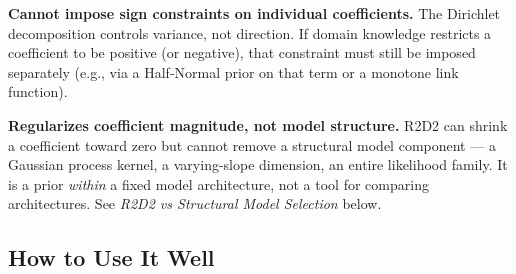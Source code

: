 \documentclass[
  letterpaper,
  DIV=11,
  numbers=noendperiod]{scrartcl}
\begin{document}
\begin{tcolorbox}
\textbf{Cannot impose sign constraints on individual coefficients.} The
Dirichlet decomposition controls variance, not direction. If domain
knowledge restricts a coefficient to be positive (or negative), that
constraint must still be imposed separately (e.g., via a Half-Normal
prior on that term or a monotone link function).

\textbf{Regularizes coefficient magnitude, not model structure.} R2D2
can shrink a coefficient toward zero but cannot remove a structural
model component --- a Gaussian process kernel, a varying-slope
dimension, an entire likelihood family. It is a prior \emph{within} a
fixed model architecture, not a tool for comparing architectures. See
\emph{R2D2 vs Structural Model Selection} below.

\end{tcolorbox}

\subsection{How to Use It Well}\label{how-to-use-it-well}
\end{document}
